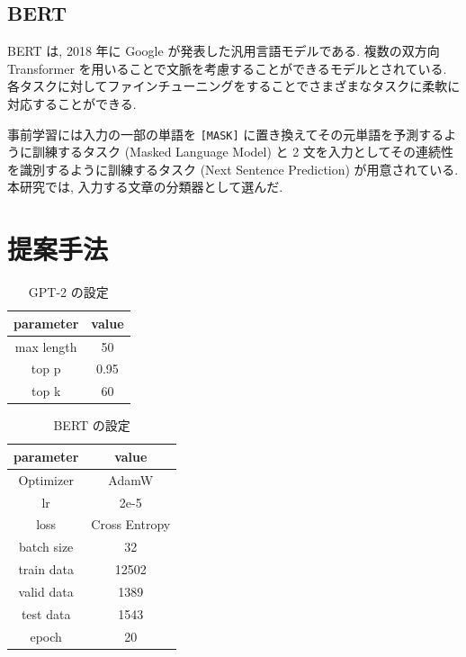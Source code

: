 \documentclass[twocolumn]{jarticle}     %
\begin{document}
\subsection{BERT}
BERT \cite{devlin2018bert} は, 2018 年に Google が発表した汎用言語モデルである.
複数の双方向 Transformer を用いることで文脈を考慮することができるモデルとされている.
各タスクに対してファインチューニングをすることでさまざまなタスクに柔軟に対応することができる.

事前学習には入力の一部の単語を \verb|[MASK]| に置き換えてその元単語を予測するように訓練するタスク (Masked Language Model) と 2 文を入力としてその連続性を識別するように訓練するタスク (Next Sentence Prediction) が用意されている.
本研究では, 入力する文章の分類器として選んだ.


\section{提案手法}

\begin{table}[tb]
  \begin{center}
    \caption{GPT-2 の設定}
    \begin{tabular}{cc}
      \hline
      parameter & value \\
      \hline
      max length & 50 \\
      top p & 0.95 \\
      top k & 60 \\
      \hline
    \end{tabular}
    \label{tab:setting_gpt}
  \end{center}
\end{table}

\begin{table}[tb]
  \begin{center}
    \caption{BERT の設定}
    \begin{tabular}{cc}
      \hline
      parameter & value \\
      \hline
      Optimizer & AdamW \\
      lr & 2e-5 \\
      loss & Cross Entropy \\
      batch size & 32 \\
      train data & 12502 \\
      valid data & 1389 \\
      test data & 1543 \\
      epoch & 20 \\
      \hline
    \end{tabular}
    \label{tab:setting_bert}
  \end{center}
\end{table}
\end{document}
